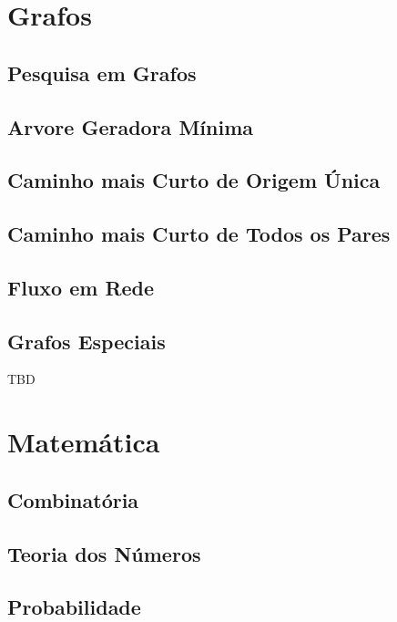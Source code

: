 \documentclass[11pt]{scrartcl}
\begin{document}
\section{Grafos}

\subsection{Pesquisa em Grafos}

\subsection{Arvore Geradora Mínima}

\subsection{Caminho mais Curto de Origem Única}

\subsection{Caminho mais Curto de Todos os Pares}

\subsection{Fluxo em Rede}

\subsection{Grafos Especiais}

TBD


\section{Matemática}

\subsection{Combinatória}

\subsection{Teoria dos Números}

\subsection{Probabilidade}
\end{document}
